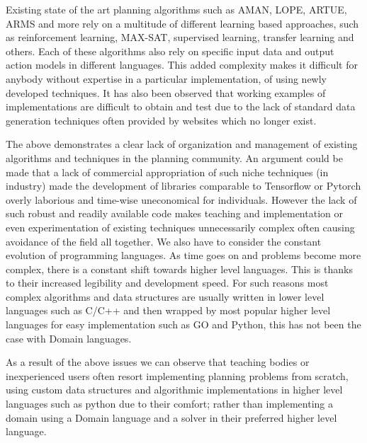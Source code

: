 Existing state of the art planning algorithms such as AMAN, LOPE, ARTUE, ARMS and more \cite{ReviewActionModels:article}
rely on a multitude of different learning based approaches, such as reinforcement learning, MAX-SAT,
supervised learning, transfer learning and others. Each of these algorithms also rely on specific input
data and output action models in different languages. This added complexity makes it difficult for anybody without
expertise in a particular implementation, of using newly developed techniques. It has also been observed that working
examples of implementations are difficult to obtain and test due to the lack of standard data generation techniques
often provided by websites which no longer exist.

The above demonstrates a clear lack of organization and management of existing algorithms and techniques in the
planning community. An argument could be made that a lack of commercial appropriation of such niche techniques
(in industry) made the development of libraries comparable to Tensorflow or Pytorch overly laborious and
time-wise uneconomical for individuals. However the lack of such robust and readily available code makes teaching and
implementation or even experimentation of existing techniques unnecessarily complex often causing avoidance of the
field all together. We also have to consider the constant evolution of programming languages.
As time goes on and problems become more complex, there is a constant shift towards higher level languages.
This is thanks to their increased legibility and development speed.
For such reasons most complex algorithms and data structures are usually written in lower level languages
such as C/C++ and then wrapped by most popular higher level languages for easy implementation such as GO and Python,
this has not been the case with Domain languages.

As a result of the above issues we can observe that teaching bodies or inexperienced users often resort implementing
planning problems from scratch, using custom data structures and algorithmic implementations in higher level languages
such as python due to their comfort; rather than implementing a domain using a Domain language and a solver in
their preferred higher level language.

